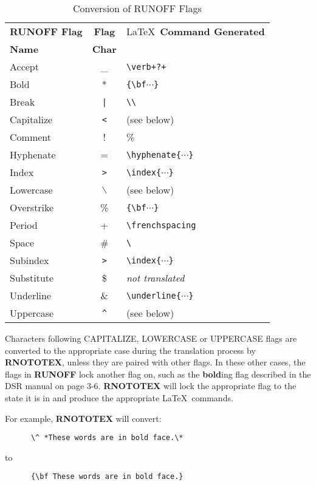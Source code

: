 \begin{table}[h]
\begin{center}
\begin{tabular}{lcl}
{\large\bf RUNOFF Flag } & {\large\bf Flag } & {\LaTeX\ \large\bf Command Generated} \\
{\large\bf Name        } & {\large\bf Char } &		\\ \hline
Accept			& \_		   & \verb!\verb+?+! \\
Bold			& *		   & \verb+{\bf+$\cdots$\verb+}+ \\
Break			& \verb+|+	   & \verb+\\+ \\
Capitalize		& \verb+<+	   & (see below) \\
Comment		        &  !		   & \% \\
Hyphenate		& =		   & \verb+\hyphenate{+$\cdots$\verb+}+ \\
Index			& \verb+>+	   & \verb+\index{+$\cdots$\verb+}+ \\
Lowercase		& $\backslash	$  & (see below) \\
Overstrike		& \%		   & \verb+{\bf+$\cdots$\verb+}+ \\
Period		        & +		   & \verb+\frenchspacing+ \\
Space			& \#		   & \verb*+\ + \\
Subindex		& \verb+>+         & \verb+\index{+$\cdots$\verb+}+ \\
Substitute		& \$		   & {\em not translated } \\
Underline		& \&		   & \verb+\underline{+$\cdots$\verb+}+ \\
Uppercase               & \verb+^+         & (see below) \\ \hline
\end{tabular}
\caption{Conversion of RUNOFF Flags\label{flag-commands}}
\end{center}
\end{table}

Characters following CAPITALIZE, LOWERCASE or UPPERCASE flags are converted
to the appropriate case during the translation process by {\bf RNOTOTEX},
unless they are paired with other flags.  In these other cases, the flags in
{\bf RUNOFF} lock another flag on, such as the {\bf bold}ing flag described
in the DSR manual\cite{dsr-manual} on page 3-6.  {\bf RNOTOTEX} will lock the
appropriate flag to the state it is in and produce the appropriate 
\LaTeX\ commands.  

For example, {\bf RNOTOTEX} will convert:
\begin{verbatim}
      \^ *These words are in bold face.\*
\end{verbatim}
to
\begin{verbatim}
      {\bf These words are in bold face.}
\end{verbatim}

